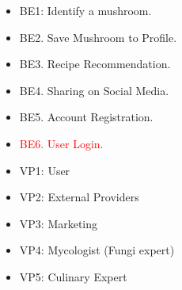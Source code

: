 \documentclass{article}
\begin{document}
\begin{itemize}
	\item BE1: Identify a mushroom.
 	\item BE2. Save Mushroom to Profile.
 	\item BE3. Recipe Recommendation.
 	\item BE4. Sharing on Social Media.
 	\item BE5. Account Registration.
 	\item \textcolor{red}{BE6. User Login.}
\end{itemize}

\newpage
{} 

\begin{itemize}
	\item VP1: User
	\item VP2: External Providers
	\item VP3: Marketing
	\item VP4: Mycologist (Fungi expert)
	\item VP5: Culinary Expert
\end{itemize}
\end{document}
